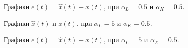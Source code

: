 \begin{figure}[!h]
\caption{Графики $e(t) = \hat{x}(t)-x(t)$, при $\alpha_L = 0.5$ и $\alpha_K = 0.5$.}
\label{4_6_0.50.5e}
\end{figure}


\begin{figure}[!h]
\caption{Графики $\hat{x}(t)$ и $x(t)$, при $\alpha_L = 5$ и $\alpha_K = 0.5$.}
\label{4_6_50.5x}
\end{figure}

\begin{figure}[!h]
\caption{Графики $e(t) = \hat{x}(t)-x(t)$, при $\alpha_L = 5$ и $\alpha_K = 0.5$.}
\label{4_6_50.5e}
\end{figure}


